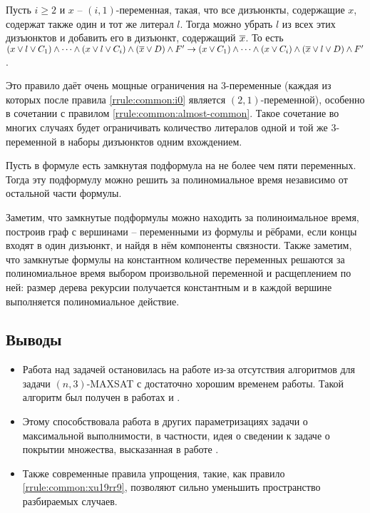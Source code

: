 \begin{rrule}
 Пусть $i \geq 2$ и $x$ -- $(i,1)$-переменная, такая, что все дизъюнкты, содержащие $x$, содержат также один и тот же литерал $l$. Тогда можно убрать $l$ из всех этих дизъюнктов и добавить его в дизъюнкт, содержащий $\overline{x}$. То есть $(x \vee l \vee C_1) \wedge \dots \wedge (x \vee l \vee C_i) \wedge (\overline{x} \vee D) \wedge F' \rightarrow (x \vee C_1) \wedge \dots \wedge (x \vee C_i) \wedge (\overline{x} \vee l \vee D) \wedge F'$.
 \label{rrule:common:xu19rr9}
\end{rrule}

Это правило даёт очень мощные ограничения на 3-переменные (каждая из которых после правила \ref{rrule:common:i0} является $(2,1)$-переменной), особенно в сочетании с правилом \ref{rrule:common:almost-common}. Такое сочетание во многих случаях будет ограничивать количество литералов одной и той же 3-переменной в наборы дизъюнктов одним вхождением.

\begin{rrule}
 Пусть в формуле есть замкнутая подформула на не более чем пяти переменных. Тогда эту подформулу можно решить за полиномиальное время независимо от остальной части формулы.
 \label{rrule:common:closed}
\end{rrule}

Заметим, что замкнутые подформулы можно находить за полиноимальное время, построив граф с вершинами -- переменными из формулы и рёбрами, если концы входят в один дизъюнкт, и найдя в нём компоненты связности. Также заметим, что замкнутые формулы на константном количестве переменных решаются за полиномиальное время выбором произвольной переменной и расщеплением по ней: размер дерева рекурсии получается константным и в каждой вершине выполняется полиномиальное действие.

\subsection{Выводы}
\label{subsec:literature-review:summary}

\begin{itemize}
 \item Работа над задачей остановилась на работе \cite{bansal99} из-за отсутствия алгоритмов для задачи $(n,3)$-MAXSAT с достаточно хорошим временем работы. Такой алгоритм был получен в работах \cite{li2017improved} и \cite{belova18}.
 \item Этому способствовала работа в других параметризациях задачи о максимальной выполнимости, в частности, идея о сведении к задаче о покрытии множества, высказанная в работе \cite{bliznets12}.
 \item Также современные правила упрощения, такие, как правило \ref{rrule:common:xu19rr9}, позволяют сильно уменьшить пространство разбираемых случаев.
\end{itemize}

